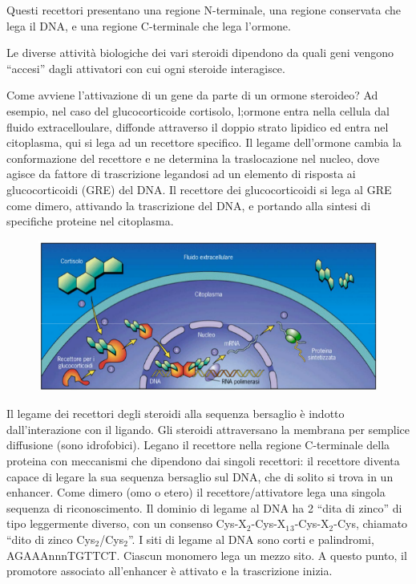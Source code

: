 \documentclass[11pt]{book}
\begin{document}
Questi recettori presentano una regione N-terminale, una regione
conservata che lega il DNA, e una regione C-terminale che lega
l'ormone.

Le diverse attività biologiche dei vari steroidi dipendono da quali geni
vengono ``accesi'' dagli attivatori con cui ogni steroide interagisce.

Come avviene l'attivazione di un gene da parte di un ormone steroideo?
Ad esempio, nel caso del glucocorticoide cortisolo, l;ormone entra nella
cellula dal fluido extracelloulare, diffonde attraverso il doppio strato
lipidico ed entra nel citoplasma, qui si lega ad un recettore specifico.
Il legame dell'ormone cambia la conformazione del recettore e ne
determina la traslocazione nel nucleo, dove agisce da fattore di
trascrizione legandosi ad un elemento di risposta ai glucocorticoidi
(GRE) del DNA. Il recettore dei glucocorticoidi si lega al GRE come
dimero, attivando la trascrizione del DNA, e portando alla sintesi di
specifiche proteine nel citoplasma.

\begin{figure}[htp]
\centering
\includegraphics[scale=1.00]{img/42_Glucocorticoidi.png}
\caption{}
\label{glucocorticoidi2}
\end{figure}

Il legame dei recettori degli steroidi alla sequenza bersaglio è indotto
dall'interazione con il ligando. Gli steroidi attraversano la membrana
per semplice diffusione (sono idrofobici). Legano il recettore nella
regione C-terminale della proteina con meccanismi che dipendono dai
singoli recettori: il recettore diventa capace di legare la sua sequenza
bersaglio sul DNA, che di solito si trova in un enhancer. Come dimero
(omo o etero) il recettore/attivatore lega una singola sequenza di
riconoscimento. Il dominio di legame al DNA ha 2 ``dita di zinco'' di
tipo leggermente diverso, con un consenso
Cys-X\(_2\)-Cys-X\(_1\)\(_3\)-Cys-X\(_2\)-Cys, chiamato ``dito di zinco
Cys\(_2\)/Cys\(_2\)''. I siti di legame al DNA sono corti e palindromi,
AGAAAnnnTGTTCT. Ciascun monomero lega un mezzo sito. A questo punto, il
promotore associato all'enhancer è attivato e la trascrizione inizia.
\end{document}
